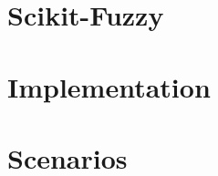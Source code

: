 \chapter{Scikit-Fuzzy}
\cite{josh_warner_2017_1002946}
\cite{perera2012intelligent}
\chapter{Implementation}
\chapter{Scenarios}